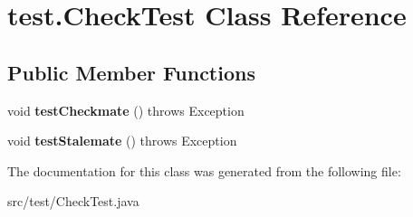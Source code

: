 \hypertarget{classtest_1_1_check_test}{}\section{test.\+Check\+Test Class Reference}
\label{classtest_1_1_check_test}
\subsection*{Public Member Functions}
\begin{DoxyCompactItemize}
\item 
\mbox{\label{classtest_1_1_check_test_a8a2eee32b1cdde4e206292c3d1a72d62}} 
void {\bfseries test\+Checkmate} ()  throws Exception 
\item 
\mbox{\label{classtest_1_1_check_test_aebcd23dbb0fe6ebcfcc97286149966b2}} 
void {\bfseries test\+Stalemate} ()  throws Exception 
\end{DoxyCompactItemize}


The documentation for this class was generated from the following file\+:\begin{DoxyCompactItemize}
\item 
src/test/Check\+Test.\+java\end{DoxyCompactItemize}
